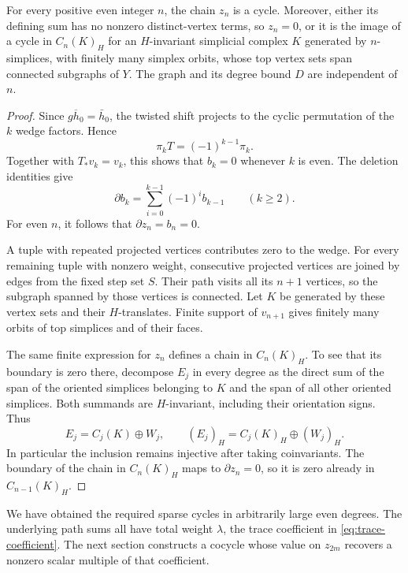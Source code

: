 \begin{proposition}\label{prop:path-cycle}
For every positive even integer $n$, the chain $z_n$ is a cycle.
Moreover, either its defining sum has no nonzero distinct-vertex terms,
so $z_n=0$, or it is the image of a cycle in $C_n(K)_H$ for an
$H$-invariant simplicial complex $K$ generated by $n$-simplices, with
finitely many simplex orbits, whose top vertex sets span connected
subgraphs of $Y$.  The graph and its degree bound $D$ are independent
of $n$.
\end{proposition}

\begin{proof}
Since $\overline{gh_0}=\bar h_0$, the twisted shift projects to the cyclic
permutation of the $k$ wedge factors.  Hence
\[
 \pi_kT=(-1)^{k-1}\pi_k.
\]
Together with $T_*v_k=v_k$, this shows that $b_k=0$ whenever $k$ is even.
The deletion identities give
\[
 \partial b_k=\sum_{i=0}^{k-1}(-1)^i b_{k-1}\qquad(k\ge2).
\]
For even $n$, it follows that $\partial z_n=b_n=0$.

A tuple with repeated projected vertices contributes zero to the wedge.
For every remaining tuple with nonzero weight, consecutive projected
vertices are joined by edges from the fixed step set $S$.  Their path
visits all its $n+1$ vertices, so the subgraph spanned by those vertices
is connected.  Let $K$ be generated by these vertex sets and their
$H$-translates.  Finite support of $v_{n+1}$ gives finitely many orbits
of top simplices and of their faces.

The same finite expression for $z_n$ defines a chain in $C_n(K)_H$.
To see that its boundary is zero there, decompose $E_j$ in every degree
as the direct sum of the span of the oriented simplices belonging to
$K$ and the span of all other oriented simplices.  Both summands are
$H$-invariant, including their orientation signs.  Thus
\[
 E_j=C_j(K)\oplus W_j,
 \qquad
 (E_j)_H=C_j(K)_H\oplus(W_j)_H.
\]
In particular the inclusion remains injective after taking
coinvariants.  The boundary of the chain in $C_n(K)_H$ maps to
$\partial z_n=0$, so it is zero already in $C_{n-1}(K)_H$.
\end{proof}

We have obtained the required sparse cycles in arbitrarily large even
degrees.  The underlying path sums all have total weight $\lambda$, the trace
coefficient in \eqref{eq:trace-coefficient}. The next section constructs
a cocycle whose value on $z_{2m}$ recovers a nonzero scalar multiple of
that coefficient.
